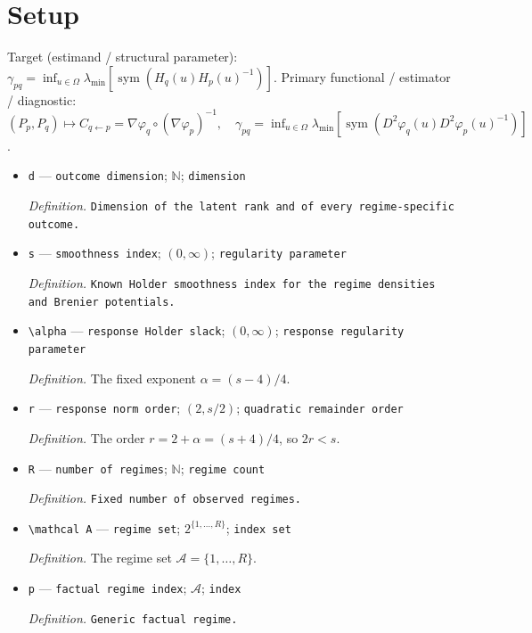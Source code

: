 \documentclass{article}
\begin{document}
\section{Setup}

Target (estimand / structural parameter): \(\gamma_{pq}=\inf_{u\in\Omega}\lambda_{\min}[\operatorname{sym}(H_q(u)H_p(u)^{-1})]\).
Primary functional / estimator / diagnostic: \((P_p,P_q)\mapsto C_{q\leftarrow p}=\nabla\varphi_q\circ(\nabla\varphi_p)^{-1},\quad \gamma_{pq}=\inf_{u\in\Omega}\lambda_{\min}[\operatorname{sym}(D^2\varphi_q(u)D^2\varphi_p(u)^{-1})]\).
\begin{itemize}
  \item \texttt{d} --- \texttt{outcome dimension}; \(\mathbb N\); \texttt{dimension}
  \par\smallskip\noindent\emph{Definition.} \texttt{Dimension of the latent rank and of every regime-\allowbreak{}specific outcome.}
  \item \texttt{s} --- \texttt{smoothness index}; \((0,\infty)\); \texttt{regularity parameter}
  \par\smallskip\noindent\emph{Definition.} \texttt{Known Holder smoothness index for the regime densities and Brenier potentials.}
  \item \texttt{\textbackslash{}\allowbreak{}alpha} --- \texttt{response Holder slack}; \((0,\infty)\); \texttt{response regularity parameter}
  \par\smallskip\noindent\emph{Definition.} The fixed exponent \(\alpha=(s-4)/4\).
  \item \texttt{r} --- \texttt{response norm order}; \((2,s/2)\); \texttt{quadratic remainder order}
  \par\smallskip\noindent\emph{Definition.} The order \(r=2+\alpha=(s+4)/4\), so \(2r<s\).
  \item \texttt{R} --- \texttt{number of regimes}; \(\mathbb N\); \texttt{regime count}
  \par\smallskip\noindent\emph{Definition.} \texttt{Fixed number of observed regimes.}
  \item \texttt{\textbackslash{}\allowbreak{}mathcal A} --- \texttt{regime set}; \(2^{\{1,\ldots,R\}}\); \texttt{index set}
  \par\smallskip\noindent\emph{Definition.} The regime set \(\mathcal A=\{1,\ldots,R\}\).
  \item \texttt{p} --- \texttt{factual regime index}; \(\mathcal A\); \texttt{index}
  \par\smallskip\noindent\emph{Definition.} \texttt{Generic factual regime.}

\end{itemize}
\end{document}
